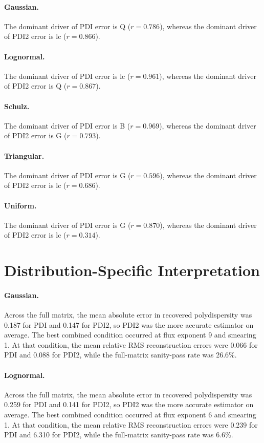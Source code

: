 \documentclass[11pt]{article}
\begin{document}
\paragraph{Gaussian.} The dominant driver of PDI error is Q ($r=0.786$), whereas the dominant driver of PDI2 error is lc ($r=0.866$).
\paragraph{Lognormal.} The dominant driver of PDI error is lc ($r=0.961$), whereas the dominant driver of PDI2 error is Q ($r=0.867$).
\paragraph{Schulz.} The dominant driver of PDI error is B ($r=0.969$), whereas the dominant driver of PDI2 error is G ($r=0.793$).
\paragraph{Triangular.} The dominant driver of PDI error is G ($r=0.596$), whereas the dominant driver of PDI2 error is lc ($r=0.686$).
\paragraph{Uniform.} The dominant driver of PDI error is G ($r=0.870$), whereas the dominant driver of PDI2 error is lc ($r=0.314$).

\section{Distribution-Specific Interpretation}
\paragraph{Gaussian.} Across the full matrix, the mean absolute error in recovered polydispersity was 0.187 for PDI and 0.147 for PDI2, so PDI2 was the more accurate estimator on average. The best combined condition occurred at flux exponent 9 and smearing 1. At that condition, the mean relative RMS reconstruction errors were 0.066 for PDI and 0.088 for PDI2, while the full-matrix sanity-pass rate was 26.6\%.
\paragraph{Lognormal.} Across the full matrix, the mean absolute error in recovered polydispersity was 0.259 for PDI and 0.141 for PDI2, so PDI2 was the more accurate estimator on average. The best combined condition occurred at flux exponent 6 and smearing 1. At that condition, the mean relative RMS reconstruction errors were 0.239 for PDI and 6.310 for PDI2, while the full-matrix sanity-pass rate was 6.6\%.
\end{document}
